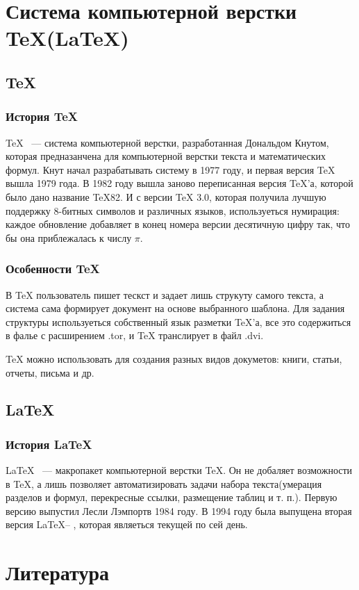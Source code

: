 \documentclass[14pt,a4paper]{article}
\begin{document}
\tableofcontents

\newpage

\section{Система компьютерной верстки \TeX(\LaTeX)}
\subsection{\TeX}
\subsubsection{История \TeX}
\TeX{} ~--- система компьютерной верстки, разработанная Дональдом Кнутом, которая
предназанчена для компьютерной верстки текста и математических формул. Кнут
начал разрабатывать систему в 1977 году, и первая версия \TeX{} вышла 1979
года. В 1982 году вышла заново переписанная версия \TeX'а, которой было дано
название TeX82. И с версии \TeX{} 3.0, которая получила лучшую поддержку
8-битных символов и различных языков, используеться нумирация: каждое обновление
добавляет в конец номера версии десятичную цифру так, что бы она приблежалась к
числу \begin{math} \pi \end{math}.

\subsubsection{Особенности \TeX}
В \TeX{} пользователь пишет тескст и задает лишь струкуту самого текста, а система
сама формирует документ на основе выбранного шаблона. Для задания структуры
используеться собственный язык разметки \TeX'а, все это содержиться в фалье с
расширением .tor, и \TeX{} транслирует в файл .dvi.

\TeX{} можно использовать для создания разных видов докуметов: книги, статьи,
отчеты, письма и др.


\subsection{\LaTeX}
\subsubsection{История \LaTeX}
\LaTeX{} ~--- макропакет компьютерной верстки \TeX{}. Он не добаляет возможности
в \TeX{}, а лишь позволяет автоматизировать задачи набора текста(умерация
разделов и формул, перекресные ссылки, размещение таблиц и т. п.). Первую версию
выпустил Лесли Лэмпортв 1984 году. В 1994 году была выпущена вторая версия
\LaTeX -- \LaTeXe{}, которая являеться текущей по сей день.


\newpage
\section{Литература}
\end{document}
